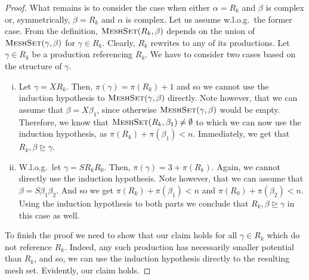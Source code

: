 \documentclass[11pt,a4paper]{amsart}
\theoremstyle{definition}
\newcommand{\MeshSet}[2]{\textsc{MeshSet}(#1,#2)}
\newcommand{\potential}[1]{\pi(#1)}
\begin{document}
\begin{proof}
        What remains is to consider the case when either $\alpha = R_k$ and
        $\beta$ is complex or, symmetrically, $\beta = R_k$ and $\alpha$ is
        complex. Let us
        assume w.l.o.g.~the former case.
        From the definition, $\MeshSet{R_k}{\beta}$ depends
        on the union of $\MeshSet{\gamma}{\beta}$ for $\gamma \in R_k$. Clearly,
        $R_k$ rewrites to any of its productions. Let $\gamma \in R_k$ be a
        production referencing $R_k$. We have to consider two cases based on
        the structure of $\gamma$.
        \begin{enumerate}[(i)]
                \item   Let $\gamma = X R_k$. Then, $\potential{\gamma} =
                        \potential{R_k} + 1$ and so we cannot use the induction
                        hypothesis to $\MeshSet{\gamma}{\beta}$ directly. Note
                        however, that we can assume that $\beta = X \beta_1$,
                        since otherwise $\MeshSet{\gamma}{\beta}$ would be
                        empty. Therefore, we know that $\MeshSet{R_k}{\beta_1} \neq
                        \emptyset$ to which we can now use the induction hypothesis,
                        as $\potential{R_k} + \potential{\beta_1} < n$.
                        Immediately, we get that $R_k,\beta \trianglerighteq
                        \gamma$. 
                \item W.l.o.g.~let $\gamma = S R_k R_{0}$.  Then,
                        $\potential{\gamma} = 3 + \potential{R_k}$. Again, we
                        cannot directly use the induction hypothesis. Note
                        however, that we can assume that $\beta = S \beta_1
                        \beta_2$. And so we get $\potential{R_k} +
                        \potential{\beta_1} < n$ and $\potential{R_0} +
                        \potential{\beta_2} < n$. Using the induction hypothesis
                        to both parts we conclude that $R_k,\beta
                        \trianglerighteq \gamma$ in this case as well.
        \end{enumerate}

        To finish the proof we need to show that our claim holds for all $\gamma \in
        R_k$ which do not reference $R_k$. Indeed, any such production has
        necessarily smaller potential than $R_k$, and so, we can use the
        induction hypothesis directly to the resulting mesh set. Evidently, our
        claim holds.
\end{proof}
\end{document}
